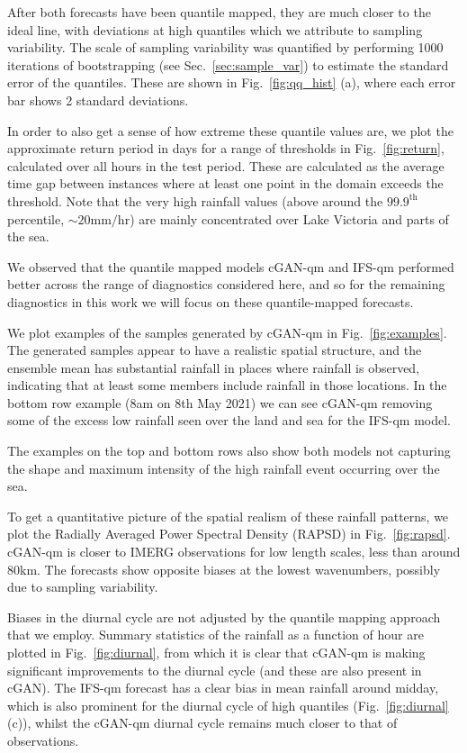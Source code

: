 \documentclass{article}
\begin{document}
After both forecasts have been quantile mapped, they are much closer to the ideal line, with deviations at high quantiles which we attribute to sampling variability. The scale of sampling variability was quantified by performing 1000 iterations of bootstrapping (see Sec.~\ref{sec:sample_var}) to estimate the standard error of the quantiles. These are shown in Fig.~\ref{fig:qq_hist} (a), where each error bar shows 2 standard deviations.


In order to also get a sense of how extreme these quantile values are, we plot the approximate return period in days for a range of thresholds in Fig.~\ref{fig:return}, calculated over all hours in the test period. These are calculated as the average time gap between instances where at least one point in the domain exceeds the threshold. Note that the very high rainfall values (above around the $99.9^{\text{th}}$ percentile, $\sim20\text{mm/hr}$) are mainly concentrated over Lake Victoria and parts of the sea. 

We observed that the quantile mapped models cGAN-qm and IFS-qm performed better across the range of diagnostics considered here, and so for the remaining diagnostics in this work we will focus on these quantile-mapped forecasts.

We plot examples of the samples generated by cGAN-qm in Fig.~\ref{fig:examples}. The generated samples appear to have a realistic spatial structure, and the ensemble mean has substantial rainfall in places where rainfall is observed, indicating that at least some members include rainfall in those locations. In the bottom row example (8am on 8th May 2021) we can see cGAN-qm removing some of the excess low rainfall seen over the land and sea for the IFS-qm model.   

The examples on the top and bottom rows also show both models not capturing the shape and maximum intensity of the high rainfall event occurring over the sea. 

To get a quantitative picture of the spatial realism of these rainfall patterns, we plot the Radially Averaged Power Spectral Density (RAPSD) in Fig.~\ref{fig:rapsd}. cGAN-qm is closer to IMERG observations for low length scales, less than around 80km. The forecasts show opposite biases at the lowest wavenumbers, possibly due to sampling variability.

Biases in the diurnal cycle are not adjusted by the quantile mapping approach that we employ. Summary statistics of the rainfall as a function of hour are plotted in Fig.~\ref{fig:diurnal}, from which it is clear that cGAN-qm is making significant improvements to the diurnal cycle (and these are also present in cGAN). The IFS-qm forecast has a clear bias in mean rainfall around midday, which is also prominent for the diurnal cycle of high quantiles (Fig.~\ref{fig:diurnal} (c)), whilst the cGAN-qm diurnal cycle remains much closer to that of observations. 
\end{document}

